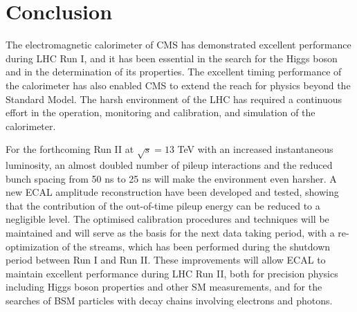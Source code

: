 \documentclass[journal]{IEEEtran}
\begin{document}
\section{Conclusion}
\label{sec:conclusions}
The electromagnetic calorimeter of CMS has demonstrated excellent performance during LHC Run I, and it has been essential in the search for the Higgs boson and in the determination of its properties. The excellent timing performance of the calorimeter has also enabled CMS to extend the reach for physics beyond the Standard Model. The harsh environment of the LHC has required a continuous effort in the operation, monitoring and calibration, and simulation of the calorimeter. 

For the forthcoming Run II at $\sqrt{s}=13$ TeV with an increased instantaneous luminosity, an almost doubled number of pileup interactions and the reduced bunch spacing from 50 ns to 25 ns will make the environment even harsher. A new ECAL amplitude reconstruction have been developed and tested, showing that the contribution of the out-of-time pileup energy can be reduced to a negligible level. The optimised calibration procedures and techniques will be maintained and will serve as the basis for the next data taking period, with a re-optimization of the streams, which has been performed during the shutdown period between Run I and Run II. These improvements will allow ECAL to maintain excellent performance during LHC Run II, both for precision physics including Higgs boson properties and other SM measurements, and for the searches of BSM particles with decay chains involving electrons and photons.


\ifCLASSOPTIONcaptionsoff
  \newpage
\fi
\end{document}
